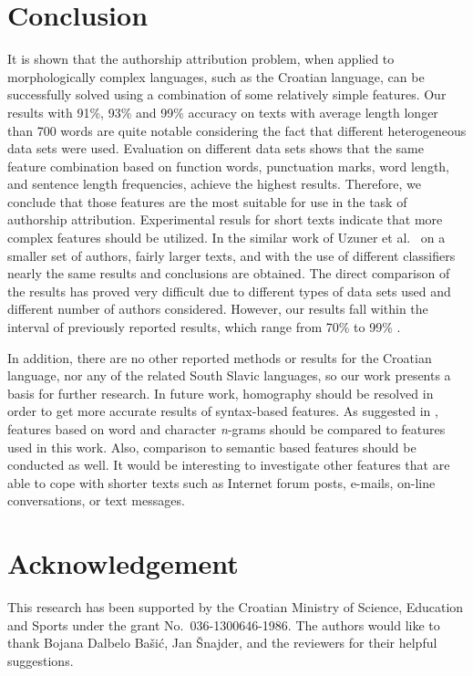 \documentclass{llncs}
\begin{document}
\section{Conclusion}
It is shown that the authorship attribution problem, when applied to
morphologically complex languages, such as the Croatian language, can be
successfully solved using a combination of some relatively simple features. Our
results with 91\%, 93\% and 99\% accuracy on texts with average length longer than 700 words are quite notable considering the fact
that different heterogeneous data sets were used. Evaluation on different data
sets shows that the same feature combination based on function words,
punctuation marks, word length, and sentence length frequencies, achieve the
highest results. Therefore, we conclude that those
features are the most suitable for use in the task of authorship
attribution. Experimental resuls for short texts indicate that more complex features should be utilized. In the similar work of Uzuner et al.\ \cite{uzuner2005comparative}
on a smaller set of authors, fairly larger texts, and with the use of
different classifiers nearly the same results and conclusions are obtained. The
direct comparison of the results has proved very difficult due to different types of data sets used  and different number of authors considered. However, our results fall within the interval of previously reported results, which range from 70\% to 99\%
\cite{argamon2005measuring,coyotl2006authorship,keselj2003n,luyckx2005shallow,stamatatos2001computer,uzuner2005comparative}.

In addition, there are no other reported methods or results for the Croatian
language, nor any of the related South Slavic languages, so our work presents a
basis for further research. In future work, homography should be resolved in order to get more accurate results of syntax-based features. As suggested in \cite{coyotl2006authorship,keselj2003n,peng2003language}, features based on word and character \emph{n}-grams should be compared to features used in this work. Also, comparison to semantic based features should be conducted as well. It would be interesting to investigate other features that are able to cope with shorter texts such as Internet forum posts, e-mails, on-line conversations, or text messages.

\section*{Acknowledgement}
This research has been supported by the Croatian Ministry of Science, Education
and Sports under the grant No.~036-1300646-1986. The authors would like to thank Bojana Dalbelo Ba\v{s}i\'c, Jan \v{S}najder, and the reviewers for their helpful suggestions.



\end{document}

